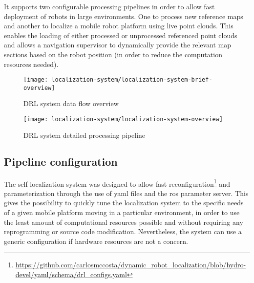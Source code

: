 It supports two configurable processing pipelines in order to allow fast deployment of robots in large environments. One to process new reference maps and another to localize a mobile robot platform using live point clouds. This enables the loading of either processed or unprocessed referenced point clouds and allows a navigation supervisor to dynamically provide the relevant map sections based on the robot position (in order to reduce the computation resources needed).

\begin{figure}[h]
	\centering
	\texttt{[image: localization-system/localization-system-brief-overview]}
	\caption{DRL system data flow overview}
	\label{fig:localization-system_localization-system-brief-overview}
\end{figure}

\begin{figure}[h]
	\centering
	\texttt{[image: localization-system/localization-system-overview]}
	\caption{DRL system detailed processing pipeline}
	\label{fig:localization-system_localization-system-overview}
\end{figure}


\subsection{Pipeline configuration}

The self-localization system was designed to allow fast reconfiguration\footnote{\url{https://github.com/carlosmccosta/dynamic_robot_localization/blob/hydro-devel/yaml/schema/drl_configs.yaml}} and parameterization through the use of yaml files and the \gls{ros} parameter server. This gives the possibility to quickly tune the localization system to the specific needs of a given mobile platform moving in a particular environment, in order to use the least amount of computational resources possible and without requiring any reprogramming or source code modification. Nevertheless, the system can use a generic configuration if hardware resources are not a concern.

